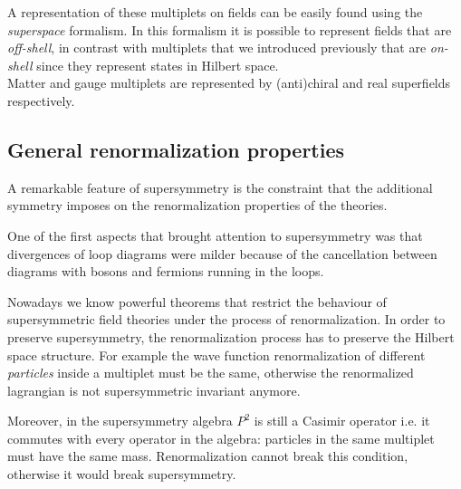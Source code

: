 
A representation of these multiplets on fields can be easily found using the \emph{superspace} formalism.
In this formalism it is possible to represent fields  that are \emph{off-shell}, in contrast with multiplets that we introduced previously that are \emph{on-shell} since they represent states in Hilbert space.\\
Matter and gauge multiplets are represented by (anti)chiral and real superfields respectively.



\subsection{General renormalization properties}

A remarkable feature of supersymmetry is the constraint that the additional symmetry imposes on the renormalization properties of the theories.

One of the first aspects that brought attention to supersymmetry was that divergences of loop diagrams were milder because of the cancellation between diagrams with bosons and fermions running in the loops. 

Nowadays we know powerful theorems that restrict the behaviour of supersymmetric field theories under the process of renormalization.
In order to preserve supersymmetry, the renormalization process has to preserve the Hilbert space structure. For example the wave function renormalization of different \emph{particles} inside a multiplet must be the same, otherwise the renormalized lagrangian is not supersymmetric invariant anymore. 

Moreover, in the supersymmetry algebra $P^2$ is still a Casimir operator i.e. it commutes with every operator in the algebra: particles in the same multiplet must have the same mass.
Renormalization cannot break this condition, otherwise it would break supersymmetry.

